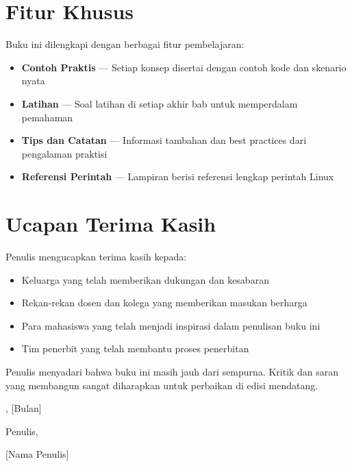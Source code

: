 \section*{Fitur Khusus}

Buku ini dilengkapi dengan berbagai fitur pembelajaran:

\begin{itemize}
    \item \textbf{Contoh Praktis} --- Setiap konsep disertai dengan contoh kode dan
          skenario nyata
    \item \textbf{Latihan} --- Soal latihan di setiap akhir bab untuk memperdalam
          pemahaman
    \item \textbf{Tips dan Catatan} --- Informasi tambahan dan best practices dari
          pengalaman praktisi
    \item \textbf{Referensi Perintah} --- Lampiran berisi referensi lengkap perintah Linux
\end{itemize}

\section*{Ucapan Terima Kasih}

Penulis mengucapkan terima kasih kepada:

\begin{itemize}
    \item Keluarga yang telah memberikan dukungan dan kesabaran
    \item Rekan-rekan dosen dan kolega yang memberikan masukan berharga
    \item Para mahasiswa yang telah menjadi inspirasi dalam penulisan buku ini
    \item Tim penerbit yang telah membantu proses penerbitan
\end{itemize}

Penulis menyadari bahwa buku ini masih jauh dari sempurna. Kritik dan saran yang
membangun sangat diharapkan untuk perbaikan di edisi mendatang.

\vspace{1cm}

\noindent
[Kota], [Bulan] \the\year

\vspace{1cm}

\noindent
\hfill Penulis,

\vspace{2cm}

\noindent
\hfill [Nama Penulis]

\cleardoublepage
